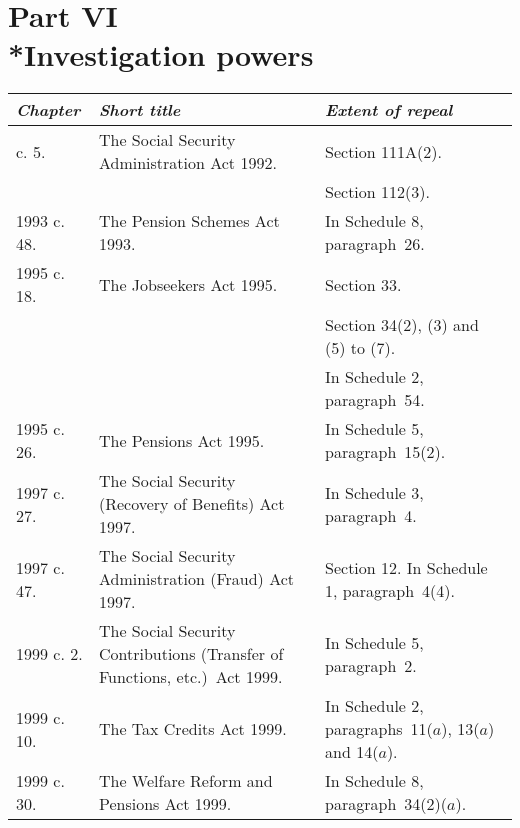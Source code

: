 \documentclass[12pt,a4paper]{article}
\begin{document}


\section[Part VI --- Investigation powers]{Part VI\\*Investigation powers}

\renewcommand\parthead{--- Schedule 9 Part VI}

{\footnotesize
\begin{longtable}{p{43.5645pt}p{185.35036pt}p{125.09244pt}}
\hline
\itshape Chapter	&\itshape Short title	&\itshape Extent of repeal\\
\hline
\endhead
\hline
\endlastfoot
1992 c. 5. 	&The Social Security Administration Act 1992. 	&Section 111A(2).\\
		&&Section 112(3).\\
1993 c. 48. 	&The Pension Schemes Act 1993. 	&In Schedule 8, paragraph~26. \\
1995 c. 18. 	&The Jobseekers Act 1995. 	&Section 33.\\ 
		&&Section 34(2), (3)  and (5)  to (7).\\
		&&In Schedule 2, paragraph~54.\\ 
1995 c. 26. 	&The Pensions Act 1995. 	&In Schedule 5, paragraph~15(2).\\
1997 c. 27. 	&The Social Security (Recovery of Benefits) Act 1997. 	&In Schedule 3, paragraph~4. \\
1997 c. 47. 	&The Social Security Administration (Fraud) Act 1997. 	&Section 12. \newline In Schedule 1, paragraph~4(4).\\
1999 c. 2. 	&The Social Security Contributions (Transfer of Functions, etc.)\ Act 1999. 	&In Schedule 5, paragraph~2. \\
1999 c. 10. 	&The Tax Credits Act 1999. 	&In Schedule 2, paragraphs~11($a$), 13($a$)  and 14($a$).\\
1999 c. 30. 	&The Welfare Reform and Pensions Act 1999. 	&In Schedule 8, paragraph~34(2)($a$).\\
\end{longtable}

}
\end{document}
